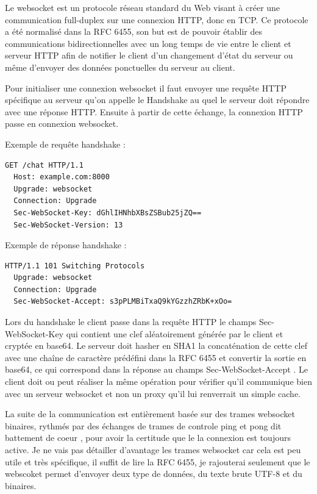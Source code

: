 Le websocket est un protocole réseau standard du Web visant à créer une communication full-duplex sur une connexion HTTP, donc en TCP. Ce protocole a été normalisé dans la RFC 6455, son but est de pouvoir établir des communications bidirectionnelles avec un long temps de vie entre le client et serveur HTTP afin de notifier le client d'un changement d'état du serveur ou même d'envoyer des données ponctuelles du serveur au client.

Pour initialiser une connexion websocket il faut envoyer une requête HTTP spécifique au serveur qu'on appelle le \og Handshake \fg{} au quel le serveur doit répondre avec une réponse HTTP. Ensuite à partir de cette échange, la connexion HTTP passe en connexion websocket.

Exemple de requête handshake :
\begin{lstlisting}[language=bash]
  GET /chat HTTP/1.1
  Host: example.com:8000
  Upgrade: websocket
  Connection: Upgrade
  Sec-WebSocket-Key: dGhlIHNhbXBsZSBub25jZQ==
  Sec-WebSocket-Version: 13
\end{lstlisting}

Exemple de réponse handshake :
\begin{lstlisting}[language=bash]
  HTTP/1.1 101 Switching Protocols
  Upgrade: websocket
  Connection: Upgrade
  Sec-WebSocket-Accept: s3pPLMBiTxaQ9kYGzzhZRbK+xOo=
\end{lstlisting}

Lors du handshake le client passe dans la requête HTTP le champs \og Sec-WebSocket-Key \fg{} qui contient une clef aléatoirement générée par le client et cryptée en base64. Le serveur doit hasher en SHA1 la concaténation de cette clef avec une chaîne de caractère prédéfini dans la RFC 6455 et convertir la sortie en base64, ce qui correspond dans la réponse au champs \og Sec-WebSocket-Accept \fg{}. Le client doit ou peut réaliser la même opération pour vérifier qu'il communique bien avec un serveur websocket et non un proxy qu'il lui renverrait un simple cache.

La suite de la communication est entièrement basée sur des trames websocket binaires, rythmés par des échanges de trames de controle ping et pong dit \og battement de coeur \fg{}, pour avoir la certitude que le la connexion est toujours active. Je ne vais pas détailler d'avantage les trames websocket car cela est peu utile et très spécifique, il suffit de lire la RFC 6455, je rajouterai seulement que le webscoket permet d'envoyer deux type de données, du texte brute UTF-8 et du binaires.


